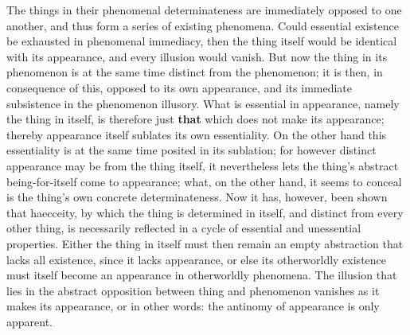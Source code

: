 \documentclass[12pt,a4paper,openany]{book}
\newcommand{\opage}[1]{\marginnote{\footnotesize\textit{[#1]}}}
\begin{document}
The things in their phenomenal determinateness are immediately
opposed to one another, and thus form a series
of existing phenomena. Could essential existence
be exhausted in phenomenal immediacy, then
the thing itself would be identical with its appearance, and
every illusion would vanish. But now the thing in its
phenomenon is at the same time distinct from the phenomenon; it is
then, in consequence of this, opposed to its own appearance, and
its immediate subsistence in the phenomenon illusory.
What is essential in appearance, namely the thing in itself,
is therefore just \textbf{that} which does not make its appearance; thereby
appearance itself sublates its own essentiality.
On the other hand this essentiality is at the same time
posited in its sublation; for however distinct appearance
may be from the thing itself, it nevertheless lets the thing's
abstract being-for-itself come to appearance; what, on the other hand,
it seems to conceal is the thing's own concrete determinateness.
Now it has, however, been shown that haecceity,
by which the thing is determined in itself, and distinct from every
other thing, is necessarily reflected in a cycle
of essential and unessential properties. Either
\setcounter{footnote}{0}%
\opage{176}the thing in itself must then remain an empty abstraction that lacks
all existence, since it lacks appearance,
or else its otherworldly existence must itself become an
appearance in otherworldly phenomena. The illusion that
lies in the abstract opposition between thing and
phenomenon vanishes as it makes its appearance, or
in other words: the antinomy of appearance is only apparent.
\end{document}
